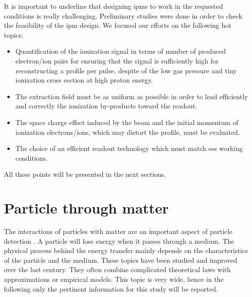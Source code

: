 \begin{refsection}
  It is important to underline that designing \acrshort{ipm}s to work in the requested conditions is really challenging. Preliminary studies were done in order to check the feasibility of the \acrshort{ipm} design. We focused our efforts on the following hot topics:
  \begin{itemize}
    \item Quantification of the ionization signal in terms of number of produced electron/ion pairs for ensuring that the signal is sufficiently high for reconstructing a profile per pulse, despite of the low gas pressure and tiny ionization cross section at high proton energy.
    \item The extraction field must be as uniform as possible in order to lead efficiently and correctly the ionization by-products toward the readout. %
    \item The space charge effect induced by the beam and the initial momentum of ionization electrons/ions, which may distort the profile, must be evaluated.
    \item The choice of an efficient readout technology which must match \acrshort{ess} working conditions.
  \end{itemize}
  All these points will be presented in the next sections.


  \section{Particle through matter}
  \label{chap3:sec_particle_in_matter}
  The interactions of particles with matter are an important aspect of particle detection \cite{Knoll2010,Leo1994}. A particle will lose energy when it passes through a medium. The physical process behind the energy transfer mainly depends on the characteristics of the particle and the medium. These topics have been studied and improved over the last century. They often combine complicated theoretical laws with approximations or empirical models. This topic is very wide, hence in the following only the pertinent information for this study will be reported.


\end{refsection}
